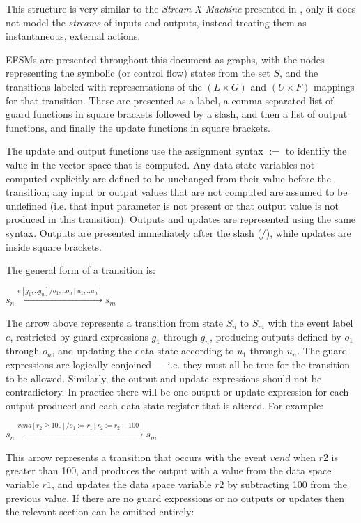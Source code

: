 This structure is very similar to the \emph{Stream X-Machine} presented in \cite{StreamXMachines}, only it does not model the \emph{streams} of inputs and outputs, instead treating them as instantaneous, external actions.

EFSMs are presented throughout this document as graphs, with the nodes representing the symbolic (or control flow) states from the set $S$, and the transitions labeled with representations of the $(L \times G)$ and $(U \times F)$ mappings for that transition. These are presented as a label, a comma separated list of guard functions in square brackets followed by a slash, and then a list of output functions, and finally the update functions in square brackets.

The update and output functions use the assignment syntax $:=$ to identify the value in the vector space that is computed. Any data state variables not computed explicitly are defined to be unchanged from their value before the transition; any input or output values that are not computed are assumed to be undefined (i.e. that input parameter is not present or that output value is not produced in this transition). Outputs and updates are represented using the same syntax. Outputs are presented immediately after the slash ($/$), while updates are inside square brackets.

The general form of a transition is: 

\begin{center}
$s_n \xrightarrow{e[g_1, .. g_n]/o_1, .. o_n[u_1, .. u_n]} s_m$ 
\end{center}

The arrow above represents a transition from state $S_n$ to $S_m$ with the event label $e$, restricted by guard expressions $g_1$ through $g_n$, producing outputs defined by $o_1$ through $o_n$, and updating the data state according to $u_1$ through $u_n$. The guard expressions are logically conjoined --- i.e. they must all be true for the transition to be allowed. Similarly, the output and update expressions should not be contradictory. In practice there will be one output or update expression for each output produced and each data state register that is altered. For example:

\begin{center}
$s_n \xrightarrow{vend[r_{2} \geq 100]/o_{1} :=r_{1}[r_{2} := r_{2} - 100]} s_m$
\end{center}

This arrow represents a transition that occurs with the event $vend$ when $r2$ is greater than 100, and produces the output with a value from the data space variable $r1$, and updates the data space variable $r2$ by subtracting 100 from the previous value. If there are no guard expressions or no outputs or updates then the relevant section can be omitted entirely:

